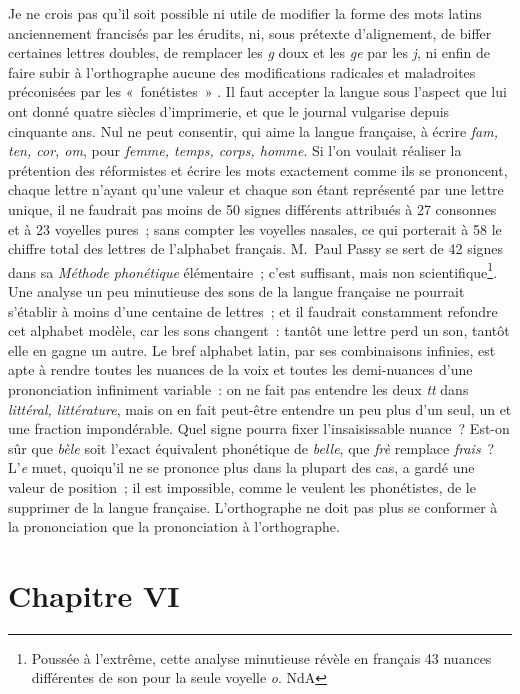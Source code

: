 \documentclass[french,twoside]{book} %
\newcommand\chapteropen{} %
\newcommand\chapterclose{} %
\begin{document}
Je ne crois pas qu’il soit possible ni utile de modifier la forme des mots latins anciennement francisés par les érudits, ni, sous prétexte d’alignement, de biffer certaines lettres doubles, de remplacer les {\itshape g} doux et les {\itshape ge} par les {\itshape j}, ni enfin de faire subir à l’orthographe aucune des modifications radicales et maladroites préconisées par les « fonétistes » . Il faut accepter la langue sous l’aspect que lui ont donné quatre siècles d’imprimerie, et que le journal vulgarise depuis cinquante ans. Nul ne peut consentir, qui aime la langue française, à écrire {\itshape fam, ten, cor, om}, pour {\itshape femme, temps, corps, homme}. Si l’on voulait réaliser la prétention des réformistes et écrire les mots exactement comme ils se prononcent, chaque lettre n’ayant qu’une valeur et chaque son étant représenté par une lettre unique, il ne faudrait pas moins de 50 signes différents attribués à 27 consonnes et à 23 voyelles pures ; sans compter les voyelles nasales, ce qui porterait à 58 le chiffre total des lettres de l’alphabet français. M. Paul Passy se sert de 42 signes dans sa {\itshape Méthode phonétique} élémentaire ; c’est suffisant, mais non scientifique\footnote{Poussée à l’extrême, cette analyse minutieuse révèle en français 43 nuances différentes de son pour la seule voyelle {\itshape o}. NdA}. Une analyse un peu minutieuse des sons de la langue française ne pourrait s’établir à moins d’une centaine de lettres ; et il faudrait constamment refondre cet alphabet modèle, car les sons changent : tantôt une lettre perd un son, tantôt elle en gagne un autre. Le bref alphabet latin, par ses combinaisons infinies, est apte à rendre toutes les nuances de la voix et toutes les demi-nuances d’une prononciation infiniment variable : on ne fait pas entendre les deux {\itshape tt} dans {\itshape littéral, littérature}, mais on en fait peut-être entendre un peu plus d’un seul, un et une fraction impondérable. Quel signe pourra fixer l’insaisissable nuance ? Est-on sûr que {\itshape bèle} soit l’exact équivalent phonétique de {\itshape belle}, que {\itshape frè} remplace {\itshape frais} ? L’{\itshape e} muet, quoiqu’il ne se prononce plus dans la plupart des cas, a gardé une valeur de position ; il est impossible, comme le veulent les phonétistes, de le supprimer de la langue française. L’orthographe ne doit pas plus se conformer à la prononciation que la prononciation à l’orthographe.
\chapterclose


\chapteropen
\chapter[{Chapitre VI}]{Chapitre VI}\renewcommand{\leftmark}{Chapitre VI}
\end{document}
